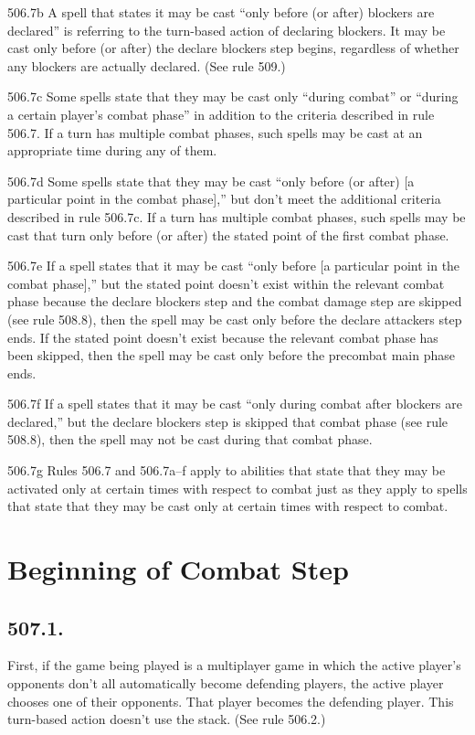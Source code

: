 506.7b A spell that states it may be cast “only before (or after) blockers are declared” is referring to the turn-based action of declaring blockers. It may be cast only before (or after) the declare blockers step begins, regardless of whether any blockers are actually declared. (See rule 509.)

506.7c Some spells state that they may be cast only “during combat” or “during a certain player’s combat phase” in addition to the criteria described in rule 506.7. If a turn has multiple combat phases, such spells may be cast at an appropriate time during any of them.

506.7d Some spells state that they may be cast “only before (or after) [a particular point in the combat phase],” but don’t meet the additional criteria described in rule 506.7c. If a turn has multiple combat phases, such spells may be cast that turn only before (or after) the stated point of the first combat phase.

506.7e If a spell states that it may be cast “only before [a particular point in the combat phase],” but the stated point doesn’t exist within the relevant combat phase because the declare blockers step and the combat damage step are skipped (see rule 508.8), then the spell may be cast only before the declare attackers step ends. If the stated point doesn’t exist because the relevant combat phase has been skipped, then the spell may be cast only before the precombat main phase ends.

506.7f If a spell states that it may be cast “only during combat after blockers are declared,” but the declare blockers step is skipped that combat phase (see rule 508.8), then the spell may not be cast during that combat phase.

506.7g Rules 506.7 and 506.7a–f apply to abilities that state that they may be activated only at certain times with respect to combat just as they apply to spells that state that they may be cast only at certain times with respect to combat.

\section{Beginning of Combat Step}
\subsection*{507.1.}
First, if the game being played is a multiplayer game in which the active player’s opponents don’t all automatically become defending players, the active player chooses one of their opponents. That player becomes the defending player. This turn-based action doesn’t use the stack. (See rule 506.2.)

